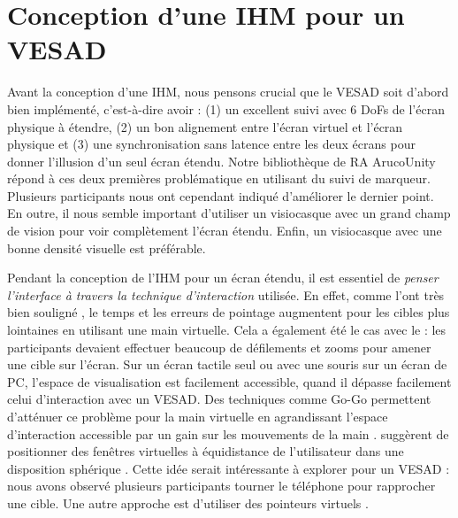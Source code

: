 \section{Conception d'une IHM pour un VESAD}
\label{sec:discussion_design}

Avant la conception d'une IHM, nous pensons crucial que le VESAD soit d'abord bien implémenté, c'est-à-dire avoir : (1) un excellent suivi avec 6 DoFs de l'écran physique à étendre, (2) un bon alignement entre l'écran virtuel et l'écran physique et (3) une synchronisation sans latence entre les deux écrans pour donner l'illusion d'un seul écran étendu. Notre bibliothèque de RA ArucoUnity répond à ces deux premières problématique en utilisant du suivi de marqueur. Plusieurs participants nous ont cependant indiqué d'améliorer le dernier point. En outre, il nous semble important d'utiliser un visiocasque avec un grand champ de vision pour voir complètement l'écran étendu. Enfin, un visiocasque avec une bonne densité visuelle est préférable.


Pendant la conception de l'IHM pour un écran étendu, il est essentiel de \emph{penser l'interface à travers la technique d'interaction} utilisée. En effet, comme l'ont très bien souligné \cite{Ens2014}, le temps et les erreurs de pointage augmentent pour les cibles plus lointaines en utilisant une main virtuelle. Cela a également été le cas avec le  : les participants devaient effectuer beaucoup de défilements et zooms pour amener une cible sur l'écran. Sur un écran tactile seul ou avec une souris sur un écran de PC, l'espace de visualisation est facilement accessible, quand il dépasse facilement celui d'interaction avec un VESAD. Des techniques comme Go-Go permettent d'atténuer ce problème pour la main virtuelle en agrandissant l'espace d'interaction accessible par un gain sur les mouvements de la main . \citeauthor{Ens2014} suggèrent de positionner des fenêtres virtuelles à équidistance de l'utilisateur dans une disposition sphérique . Cette idée serait intéressante à explorer pour un VESAD : nous avons observé plusieurs participants tourner le téléphone pour rapprocher une cible. Une autre approche est d'utiliser des pointeurs virtuels \citep{Argelaguet2013}.

